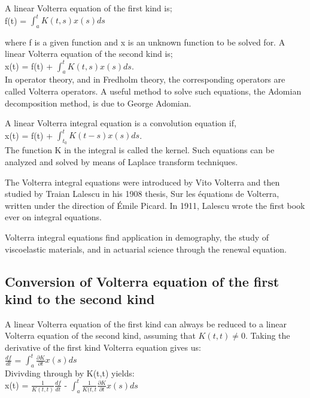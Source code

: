 \documentclass[12pt]{article}
\begin{document}
A linear Volterra equation of the first kind is;\\
 f(t) = \(\int_{a}^{t} K(t, s) x(s) ds\)

where f is a given function and x is an unknown function to be solved for. A linear Volterra equation of the second kind is;\\

x(t) = f(t) + \(\int_{a}^{t} K(t,s) x(s) ds\).\\

In operator theory, and in Fredholm theory, the corresponding operators are called Volterra operators. A useful method to solve such equations, the Adomian decomposition method, is due to George Adomian.

A linear Volterra integral equation is a convolution equation if,\\

x(t) = f(t) + \(\int_{t_{0}}^{t} K(t - s) x(s) ds\).\\

The function K in the integral is called the kernel. Such equations can be analyzed and solved by means of Laplace transform techniques.

The Volterra integral equations were introduced by Vito Volterra and then studied by Traian Lalescu in his 1908 thesis, Sur les équations de Volterra, written under the direction of Émile Picard. In 1911, Lalescu wrote the first book ever on integral equations.

Volterra integral equations find application in demography, the study of viscoelastic materials, and in actuarial science through the renewal equation.
\subsection{Conversion of Volterra equation of the first kind to the second kind}
A linear Volterra equation of the first kind can always be reduced to a linear Volterra equation of the second kind, assuming that $K(t,t)\neq{0}$. Taking the derivative of the first kind Volterra equation gives us:\\

$\frac{df}{dt}$ = \(\int_{a}^{t} \frac{\partial K}{\partial t} x(s) ds\)\\

Divivding through by K(t,t) yields:\\

x(t) = $\frac{1}{K(t,t)} \frac{df}{dt}$ - \(\int_{a}^{t} \frac{1}{K(t,t} \frac{\partial K}{\partial t} x(s) ds\)\\
\end{document}
